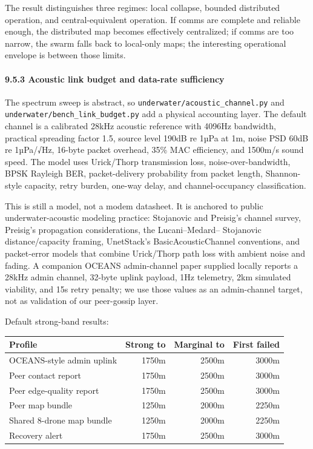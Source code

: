 The result distinguishes three regimes: local collapse, bounded
distributed operation, and central-equivalent operation. If comms are
complete and reliable enough, the distributed map becomes effectively
centralized; if comms are too narrow, the swarm falls back to local-only
maps; the interesting operational envelope is between those limits.

\paragraph{9.5.3 Acoustic link budget and data-rate
sufficiency}\label{acoustic-link-budget-and-data-rate-sufficiency}

The spectrum sweep is abstract, so
\texttt{underwater/acoustic\_channel.py} and
\texttt{underwater/bench\_link\_budget.py} add a physical accounting
layer. The default channel is a calibrated 28kHz acoustic reference with
4096Hz bandwidth, practical spreading factor 1.5, source level 190dB re
1µPa at 1m, noise PSD 60dB re 1µPa/√Hz, 16-byte packet overhead, 35\%
MAC efficiency, and 1500m/s sound speed. The model uses Urick/Thorp
transmission loss, noise-over-bandwidth, BPSK Rayleigh BER,
packet-delivery probability from packet length, Shannon-style capacity,
retry burden, one-way delay, and channel-occupancy classification.

This is still a model, not a modem datasheet. It is anchored to public
underwater-acoustic modeling practice: Stojanovic and Preisig's channel
survey, Preisig's propagation considerations, the Lucani--Medard--
Stojanovic distance/capacity framing, UnetStack's BasicAcousticChannel
conventions, and packet-error models that combine Urick/Thorp path loss
with ambient noise and fading. A companion OCEANS admin-channel paper
supplied locally reports a 28kHz admin channel, 32-byte uplink payload,
1Hz telemetry, 2km simulated viability, and 15s retry penalty; we use
those values as an admin-channel target, not as validation of our
peer-gossip layer.

Default strong-band results:

{\def\LTcaptype{none} %
\begin{longtable}[]{@{}lrrr@{}}
\toprule\noalign{}
Profile & Strong to & Marginal to & First failed \\
\midrule\noalign{}
\endhead
\bottomrule\noalign{}
\endlastfoot
OCEANS-style admin uplink & 1750m & 2500m & 3000m \\
Peer contact report & 1750m & 2500m & 3000m \\
Peer edge-quality report & 1750m & 2500m & 3000m \\
Peer map bundle & 1250m & 2000m & 2250m \\
Shared 8-drone map bundle & 1250m & 2000m & 2250m \\
Recovery alert & 1750m & 2500m & 3000m \\
\end{longtable}
}

